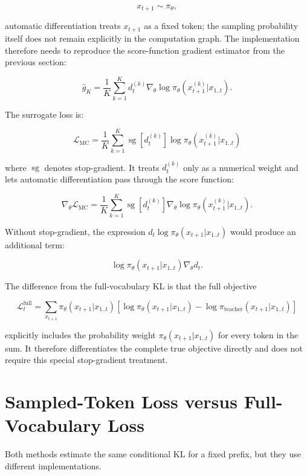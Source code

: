 \documentclass[11pt,a4paper]{article}
\begin{document}
\[
x_{t+1}\sim\pi_\theta,
\]

automatic differentiation treats $x_{t+1}$ as a fixed token; the sampling probability itself does not remain explicitly in the computation graph. The implementation therefore needs to reproduce the score-function gradient estimator from the previous section:

\[
\hat g_K
=
\frac1K
\sum_{k=1}^{K}
d_t^{(k)}
\nabla_\theta
\log\pi_\theta(x_{t+1}^{(k)}|x_{1..t}).
\]

The surrogate loss is:

\[
\boxed{
\mathcal L_{\mathrm{MC}}
=
\frac1K
\sum_{k=1}^{K}
\operatorname{sg}\!\left[d_t^{(k)}\right]
\log\pi_\theta(x_{t+1}^{(k)}|x_{1..t})
}
\]

where $\operatorname{sg}$ denotes stop-gradient. It treats $d_t^{(k)}$ only as a numerical weight and lets automatic differentiation pass through the score function:

\[
\nabla_\theta\mathcal L_{\mathrm{MC}}
=
\frac1K
\sum_{k=1}^{K}
\operatorname{sg}\!\left[d_t^{(k)}\right]
\nabla_\theta
\log\pi_\theta(x_{t+1}^{(k)}|x_{1..t}).
\]

Without stop-gradient, the expression $d_t\log\pi_\theta(x_{t+1}|x_{1..t})$ would produce an additional term:

\[
\log\pi_\theta(x_{t+1}|x_{1..t})\nabla_\theta d_t.
\]

The difference from the full-vocabulary KL is that the full objective

\[
\mathcal L_t^{\text{full}}
=
\sum_{x_{t+1}}
\pi_\theta(x_{t+1}|x_{1..t})
\left[
\log\pi_\theta(x_{t+1}|x_{1..t})
-
\log\pi_{\text{teacher}}(x_{t+1}|x_{1..t})
\right]
\]

explicitly includes the probability weight $\pi_\theta(x_{t+1}|x_{1..t})$ for every token in the sum. It therefore differentiates the complete true objective directly and does not require this special stop-gradient treatment.

\section{Sampled-Token Loss versus Full-Vocabulary Loss}

Both methods estimate the same conditional KL for a fixed prefix, but they use different implementations.
\end{document}

